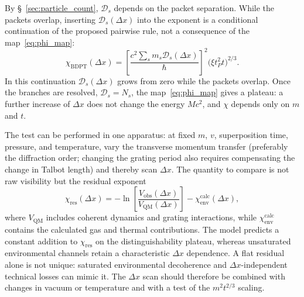 \documentclass[11pt,a4paper]{article}
\begin{document}
By \S~\ref{sec:particle_count}, $\mathcal D_s$ depends on the packet separation. While the packets overlap, inserting $\mathcal D_s(\Delta x)$ into the exponent is a conditional continuation of the proposed pairwise rule, not a consequence of the map~\eqref{eq:phi_map}:
\begin{equation}
\chi_{\mathrm{BDPT}}(\Delta x)=
\left[\frac{c^2\sum_s m_s\mathcal D_s(\Delta x)}{\hbar}\right]^2
\bigl(\xi t_P^2t\bigr)^{2/3}.
\label{eq:chi_dx}
\end{equation}
In this continuation $\mathcal D_s(\Delta x)$ grows from zero while the packets overlap. Once the branches are resolved, $\mathcal D_s=N_s$, the map~\eqref{eq:phi_map} gives a plateau: a further increase of $\Delta x$ does not change the energy $Mc^2$, and $\chi$ depends only on $m$ and $t$.

The test can be performed in one apparatus: at fixed $m$, $v$, superposition time, pressure, and temperature, vary the transverse momentum transfer (preferably the diffraction order; changing the grating period also requires compensating the change in Talbot length) and thereby scan $\Delta x$. The quantity to compare is not raw visibility but the residual exponent
\begin{equation}
\chi_{\mathrm{res}}(\Delta x)=
-\ln\!\left[\frac{V_{\mathrm{obs}}(\Delta x)}{V_{\mathrm{QM}}(\Delta x)}\right]
-\chi_{\mathrm{env}}^{\mathrm{calc}}(\Delta x),
\end{equation}
where $V_{\mathrm{QM}}$ includes coherent dynamics and grating interactions, while $\chi_{\mathrm{env}}^{\mathrm{calc}}$ contains the calculated gas and thermal contributions. The model predicts a constant addition to $\chi_{\mathrm{res}}$ on the distinguishability plateau, whereas unsaturated environmental channels retain a characteristic $\Delta x$ dependence. A flat residual alone is not unique: saturated environmental decoherence and $\Delta x$-independent technical losses can mimic it. The $\Delta x$ scan should therefore be combined with changes in vacuum or temperature and with a test of the $m^2t^{2/3}$ scaling.
\end{document}
